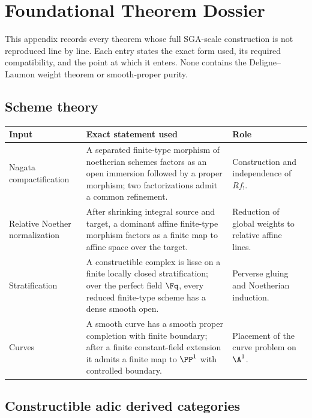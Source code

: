 \chapter{Foundational Theorem Dossier}
\label{app:perverse-foundations}

This appendix records every theorem whose full SGA-scale construction is not
reproduced line by line.  Each entry states the exact form used, its required
compatibility, and the point at which it enters.  None contains the
Deligne--Laumon weight theorem or smooth-proper purity.

\section{Scheme theory}

\begin{longtable}{
 >{\raggedright\arraybackslash}p{}
 >{\raggedright\arraybackslash}p{}
 >{\raggedright\arraybackslash}p{}}
\toprule
Input & Exact statement used & Role\\
\midrule
\endhead
Nagata compactification &
A separated finite-type morphism of noetherian schemes factors as an open
immersion followed by a proper morphism; two factorizations admit a common
refinement. &
Construction and independence of \(Rf_!\).\\

Relative Noether normalization &
After shrinking integral source and target, a dominant affine finite-type
morphism factors as a finite map to affine space over the target. &
Reduction of global weights to relative affine lines.\\

Stratification &
A constructible complex is lisse on a finite locally closed stratification;
over the perfect field \(\Fq\), every reduced finite-type scheme has a dense
smooth open. &
Perverse gluing and Noetherian induction.\\

Curves &
A smooth curve has a smooth proper completion with finite boundary; after a
finite constant-field extension it admits a finite map to \(\PP^1\) with
controlled boundary. &
Placement of the curve problem on \(\A^1\).\\
\bottomrule
\end{longtable}

\section{Constructible adic derived categories}

